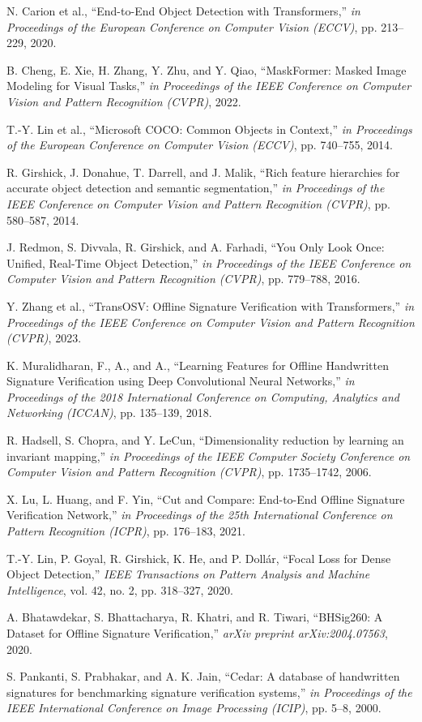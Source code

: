 \documentclass{article}
\begin{document}
\begin{thebibliography}{10}
	N. Carion et al.,
	``End-to-End Object Detection with Transformers,''
	\emph{in Proceedings of the European Conference on Computer Vision (ECCV)},
	pp. 213--229, 2020.

	B. Cheng, E. Xie, H. Zhang, Y. Zhu, and Y. Qiao,
	``MaskFormer: Masked Image Modeling for Visual Tasks,''
	\emph{in Proceedings of the IEEE Conference on Computer Vision and Pattern Recognition (CVPR)},
	2022.

	T.-Y. Lin et al.,
	``Microsoft COCO: Common Objects in Context,''
	\emph{in Proceedings of the European Conference on Computer Vision (ECCV)},
	pp. 740--755, 2014.

	R. Girshick, J. Donahue, T. Darrell, and J. Malik,
	``Rich feature hierarchies for accurate object detection and semantic segmentation,''
	\emph{in Proceedings of the IEEE Conference on Computer Vision and Pattern Recognition (CVPR)},
	pp. 580--587, 2014.

	J. Redmon, S. Divvala, R. Girshick, and A. Farhadi,
	``You Only Look Once: Unified, Real-Time Object Detection,''
	\emph{in Proceedings of the IEEE Conference on Computer Vision and Pattern Recognition (CVPR)},
	pp. 779--788, 2016.

	Y. Zhang et al.,
	``TransOSV: Offline Signature Verification with Transformers,''
	\emph{in Proceedings of the IEEE Conference on Computer Vision and Pattern Recognition (CVPR)},
	2023.

	K. Muralidharan, F., A., and A.,
	``Learning Features for Offline Handwritten Signature Verification using Deep Convolutional Neural Networks,''
	\emph{in Proceedings of the 2018 International Conference on Computing, Analytics and Networking (ICCAN)},
	pp. 135--139, 2018.

	R. Hadsell, S. Chopra, and Y. LeCun,
	``Dimensionality reduction by learning an invariant mapping,''
	\emph{in Proceedings of the IEEE Computer Society Conference on Computer Vision and Pattern Recognition (CVPR)},
	pp. 1735--1742, 2006.

	X. Lu, L. Huang, and F. Yin,
	``Cut and Compare: End-to-End Offline Signature Verification Network,''
	\emph{in Proceedings of the 25th International Conference on Pattern Recognition (ICPR)},
	pp. 176--183, 2021.

	T.-Y. Lin, P. Goyal, R. Girshick, K. He, and P. Dollár,
	``Focal Loss for Dense Object Detection,''
	\emph{IEEE Transactions on Pattern Analysis and Machine Intelligence},
	vol. 42, no. 2, pp. 318--327, 2020.

	A. Bhatawdekar, S. Bhattacharya, R. Khatri, and R. Tiwari,
	``BHSig260: A Dataset for Offline Signature Verification,''
	\emph{arXiv preprint arXiv:2004.07563},
	2020.

	S. Pankanti, S. Prabhakar, and A. K. Jain,
	``Cedar: A database of handwritten signatures for benchmarking signature verification systems,''
	\emph{in Proceedings of the IEEE International Conference on Image Processing (ICIP)},
	pp. 5--8, 2000.

\end{thebibliography}
\end{document}
